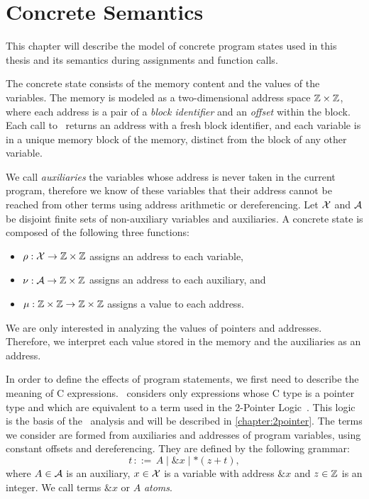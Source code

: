 \chapter{Concrete Semantics}\label{chapter:concrete_semantics}

This chapter will describe the model of concrete program states used in this thesis and its semantics during assignments and function calls.

The concrete state consists of the memory content and the values of the variables.
The memory is modeled as a two-dimensional address space $\mathbb{Z} \times \mathbb{Z}$, where each address is a pair of a \emph{block identifier} and an \emph{offset} within the block.
Each call to \malloc\ returns an address with a fresh block identifier, and each variable is in a unique memory block of the memory, distinct from the block of any other variable.

We call \emph{auxiliaries} the variables whose address is never taken in the current program, therefore we know of these variables that their address cannot be reached from other terms using address arithmetic or dereferencing.
Let $\mathcal{X}$ and $\mathcal{A}$ be disjoint finite sets of non-auxiliary variables and auxiliaries.
A concrete state is composed of the following three functions:
\begin{itemize}
    \item $\rho : \mathcal{X} \rightarrow \mathbb{Z} \times \mathbb{Z}$ assigns an address to each variable,
    \item $\nu : \mathcal{A} \rightarrow \mathbb{Z} \times \mathbb{Z}$ assigns an address to each auxiliary, and
    \item $\mu : \mathbb{Z} \times \mathbb{Z} \rightarrow \mathbb{Z} \times \mathbb{Z}$ assigns a value to each address.
\end{itemize}
We are only interested in analyzing the values of pointers and addresses. Therefore, we interpret each value stored in the memory and the auxiliaries as an address.

In order to define the effects of program statements, we first need to describe the meaning of C expressions.
\cpo\ considers only expressions whose C type is a pointer type and which are equivalent to a term used in the 2-Pointer Logic~\cite{2pointer}.
This logic is the basis of the \cpo\ analysis and will be described in \cref{chapter:2pointer}.
The terms we consider are formed from auxiliaries and addresses of program variables, using constant offsets and dereferencing.
They are defined by the following grammar:
\[
    t\,{::=}\,A \mid \&x \mid *(z+t),
\]
where $A\in \mathcal{A}$ is an auxiliary, $x \in \mathcal{X}$ is a variable with address $\&x$ and $z \in \mathbb{Z}$ is an integer.
We call terms $\&x$ or $A$ \emph{atoms}.

